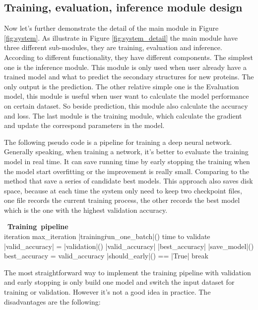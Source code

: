 \subsection{Training, evaluation, inference module design}
Now let's further demonstrate the detail of the main module in Figure \ref{fig:system}. As illustrate in Figure \ref{fig:system_detail} the main module have three different sub-modules, they are training, evaluation and inference. According to different functionality, they have different components. The simplest one is the inference module. This module is only used when user already have a trained model and what to predict the secondary structures for new proteins. The only output is the prediction. The other relative simple one is the Evaluation model, this module is useful when user want to calculate the model performance on certain dataset. So beside prediction, this module also calculate the accuracy and loss. The last module is the training module, which calculate the gradient and update the correspond parameters in the model.\par

The following pseudo code is a pipeline for training a deep neural network. Generally speaking, when training a network, it's better to evaluate the training model in real time. It can save running time by early stopping the training when the model start overfitting or the improvement is really small. Comparing to the method that save a series of candidate best models. This approach also saves disk space, because at each time the system only need to keep two checkpoint files, one file records the current training process, the other records the best model which is the one with the highest validation accuracy.\par


\begin{program}
\mbox{\textbf{ Training pipeline} }
\BEGIN \\ 
\WHILE iteration \lt max\_iteration \DO 
    \CALL |training\.run\_one\_batch|()
    \IF time to validate 
        \CALL |valid_accuracy| = |validation|()
        \IF |valid_accuracy| \gt |best_accuracy|
                  \CALL |save\_model|()
                  best_accuracy = valid_accuracy\FI
    \IF \CALL |should_early|() == |True|
        break
    
\end{program}

The most straightforward way to implement the training pipeline with validation and early stopping is only build one model and switch the input dataset for training or validation. However it's not a good idea in practice. The disadvantages are the following:

